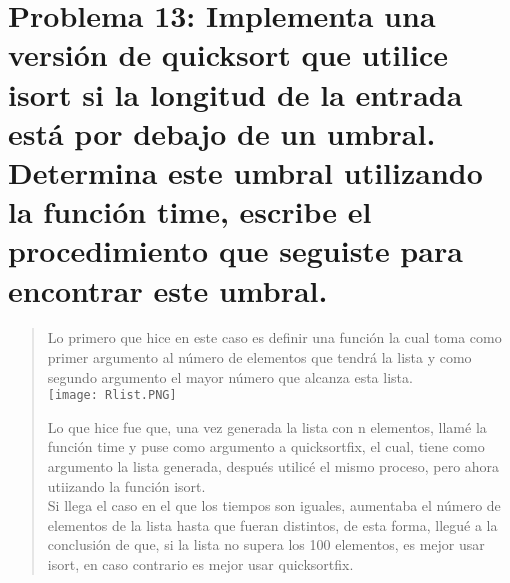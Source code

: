 \documentclass{article}
\begin{document}
\section{Problema 13: Implementa una versión de quicksort que utilice isort si la longitud de la entrada está por debajo de un umbral. Determina este umbral utilizando la función time, escribe el procedimiento que seguiste para encontrar este umbral.}
\begin{quote}
    Lo primero que hice en este caso es definir una función la cual toma como primer argumento al número de elementos que tendrá la lista y como segundo argumento el mayor número que alcanza esta lista.\\
    
    \texttt{[image: Rlist.PNG]}
    
    Lo que hice fue que, una vez generada la lista con n elementos, llamé la función time y puse como argumento a quicksortfix, el cual, tiene como argumento la lista generada, después utilicé el mismo proceso, pero ahora utiizando la función isort.\\
    Si llega el caso en el que los tiempos son iguales, aumentaba el número de elementos de la lista hasta que fueran distintos, de esta forma, llegué a la conclusión de que, si la lista no supera los 100 elementos, es mejor usar isort, en caso contrario es mejor usar quicksortfix.
\end{quote}
\end{document}
